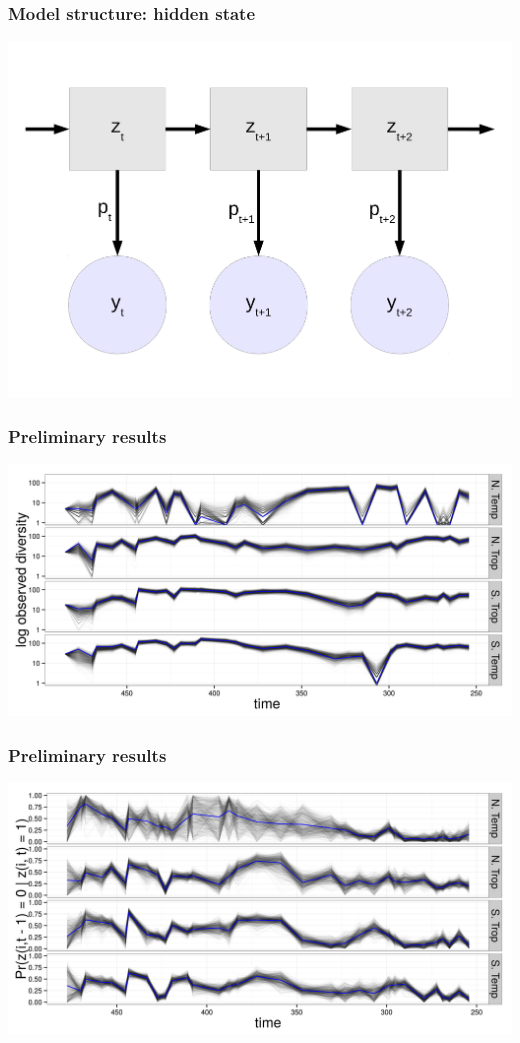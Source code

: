 \documentclass{beamer}
\begin{document}
\begin{frame}
  \frametitle{Model structure: hidden state}
  \begin{center}
    \includegraphics[width=\textwidth,height=0.8\textheight,keepaspectratio=true]{figure/hidden_state}
  \end{center}
\end{frame}

\begin{frame}
  \frametitle{Preliminary results}
  \begin{center}
    \includegraphics[width=\textwidth,height=0.8\textheight,keepaspectratio=true]{figure/obs_div}
  \end{center}
\end{frame}

\begin{frame}
  \frametitle{Preliminary results}
  \begin{center}
    \includegraphics[width=\textwidth,height=0.8\textheight,keepaspectratio=true]{figure/turnover}
  \end{center}
\end{frame}
\end{document}

